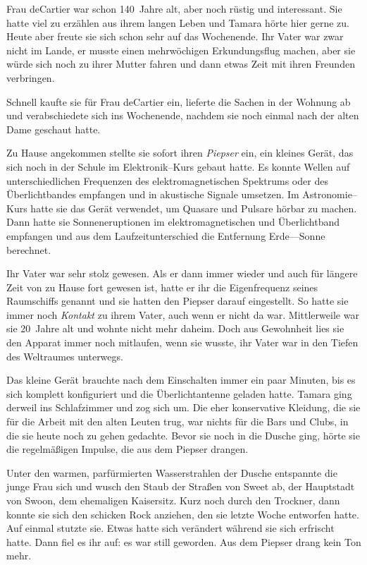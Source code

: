 Frau deCartier war schon 140~Jahre alt, aber noch rüstig und interessant. Sie hatte viel zu erzählen aus ihrem langen Leben und Tamara hörte hier gerne zu. Heute aber freute sie sich schon sehr auf das Wochenende. Ihr Vater war zwar nicht im Lande, er musste einen mehrwöchigen Erkundungsflug machen, aber sie würde sich noch zu ihrer Mutter fahren und dann etwas Zeit mit ihren Freunden verbringen.

Schnell kaufte sie für Frau deCartier ein, lieferte die Sachen in der Wohnung ab und verabschiedete sich ins Wochenende, nachdem sie noch einmal nach der alten Dame geschaut hatte.

Zu Hause angekommen stellte sie sofort ihren \emph{Piepser} ein, ein kleines Gerät, das sich noch in der Schule im Elektronik--Kurs gebaut hatte. Es konnte Wellen auf unterschiedlichen Frequenzen des elektromagnetischen Spektrums oder des Überlichtbandes empfangen und in akustische Signale umsetzen. Im Astronomie--Kurs hatte sie das Gerät verwendet, um Quasare und Pulsare hörbar zu machen. Dann hatte sie Sonneneruptionen im elektromagnetischen und Überlichtband empfangen und aus dem Laufzeitunterschied die Entfernung Erde---Sonne berechnet.

Ihr Vater war sehr stolz gewesen. Als er dann immer wieder und auch für längere Zeit von zu Hause fort gewesen ist, hatte er ihr die Eigenfrequenz seines Raumschiffs genannt und sie hatten den Piepser darauf eingestellt. So hatte sie immer noch \emph{Kontakt} zu ihrem Vater, auch wenn er nicht da war. Mittlerweile war sie 20~Jahre alt und wohnte nicht mehr daheim. Doch aus Gewohnheit lies sie den Apparat immer noch mitlaufen, wenn sie wusste, ihr Vater war in den Tiefen des Weltraumes unterwegs.

Das kleine Gerät brauchte nach dem Einschalten immer ein paar Minuten, bis es sich komplett konfiguriert und die Überlichtantenne geladen hatte. Tamara ging derweil ins Schlafzimmer und zog sich um. Die eher konservative Kleidung, die sie für die Arbeit mit den alten Leuten trug, war nichts für die Bars und Clubs, in die sie heute noch zu gehen gedachte. Bevor sie noch in die Dusche ging, hörte sie die regelmäßigen Impulse, die aus dem Piepser drangen.

Unter den warmen, parfürmierten Wasserstrahlen der Dusche entspannte die junge Frau sich und wusch den Staub der Straßen von Sweet ab, der Hauptstadt von Swoon, dem ehemaligen Kaisersitz. Kurz noch durch den Trockner, dann konnte sie sich den schicken Rock anziehen, den sie letzte Woche entworfen hatte. Auf einmal stutzte sie. Etwas hatte sich verändert während sie sich erfrischt hatte. Dann fiel es ihr auf: es war still geworden. Aus dem Piepser drang kein Ton mehr.

